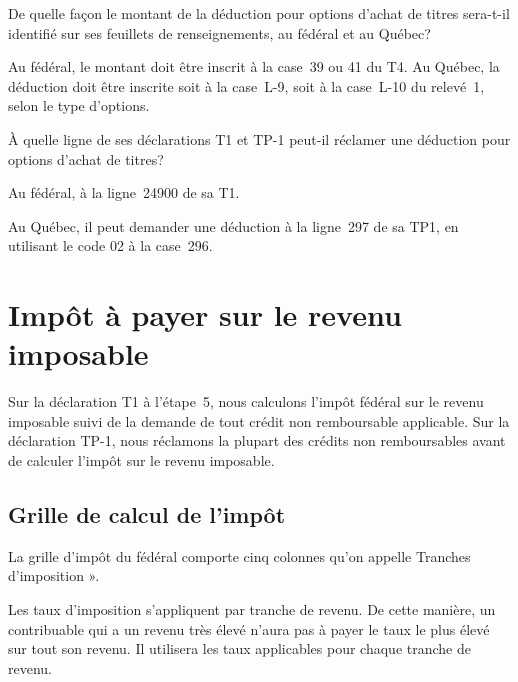 \begin{sousQuestion}
	De quelle façon le montant de la déduction pour options d'achat de titres sera-t-il identifié sur ses feuillets de renseignements, au fédéral et au Québec?
\end{sousQuestion}
Au fédéral, le montant doit être inscrit à la case~39 ou 41 du T4. Au Québec, la déduction doit être inscrite soit à la case~L-9, soit à la case~L-10 du relevé~1, selon le type d'options. 

\begin{sousQuestion}
	À quelle ligne de ses déclarations T1 et TP-1 peut-il réclamer une déduction pour options d'achat de titres?
\end{sousQuestion}
Au fédéral, à la ligne~24900 de sa T1.

Au Québec, il peut demander une déduction à la ligne~297 de sa TP1, en utilisant le code 02 à la case~296.



\section{Impôt à payer sur le revenu imposable}
\begin{intro}
	Sur la déclaration T1 à l'étape~5, nous calculons l'impôt fédéral sur le revenu imposable suivi de la demande de tout crédit non remboursable applicable. Sur la déclaration TP-1, nous réclamons la plupart des crédits non remboursables avant de calculer l'impôt sur le revenu imposable. 
\end{intro}


\subsection{Grille de calcul de l'impôt}
La grille d'impôt du fédéral comporte cinq colonnes qu'on appelle \og Tranches d'imposition ».

\begin{note}
	Les taux d'imposition s'appliquent par tranche de revenu. De cette manière, un contribuable qui a un revenu très élevé n'aura pas à payer le taux le plus élevé sur tout son revenu. Il utilisera les taux applicables pour chaque tranche de revenu.
\end{note}



